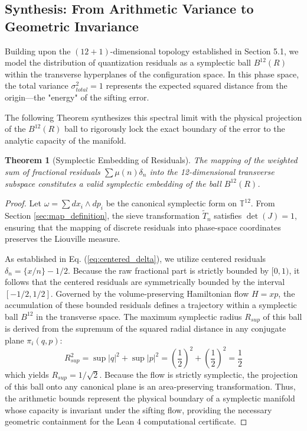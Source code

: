 \documentclass[sn-mathphys-num, pdflatex]{sn-jnl}
\newtheorem{theorem}{Theorem}[section]
\begin{document}
\subsection{Synthesis: From Arithmetic Variance to Geometric Invariance}
\label{sec:synthesis}

Building upon the $(12+1)$-dimensional topology established in Section 5.1, we model the distribution of quantization residuals as a symplectic ball $B^{12}(R)$ within the transverse hyperplanes of the configuration space. In this phase space, the total variance $\sigma_{total}^2 = 1$ represents the expected squared distance from the origin—the "energy" of the sifting error. 

The following Theorem synthesizes this spectral limit with the physical projection of the $B^{12}(R)$ ball to rigorously lock the exact boundary of the error to the analytic capacity of the manifold.

\begin{theorem}[Symplectic Embedding of Residuals]
\label{SER}
\textit{The mapping of the weighted sum of fractional residuals $\sum \mu(n) \delta_n$ into the 12-dimensional transverse subspace constitutes a valid symplectic embedding of the ball $B^{12}(R)$.}
\end{theorem}

\begin{proof}
Let $\omega = \sum dx_i \wedge dp_i$ be the canonical symplectic form on $\mathbb{T}^{12}$. From Section \ref{sec:map_definition}, the sieve transformation $\tilde{T}_n$ satisfies $\det(J) = 1$, ensuring that the mapping of discrete residuals into phase-space coordinates preserves the Liouville measure. 

As established in Eq. (\ref{eq:centered_delta}), we utilize centered residuals $\delta_n = \{x/n\} - 1/2$. Because the raw fractional part is strictly bounded by $[0, 1)$, it follows that the centered residuals are symmetrically bounded by the interval $[-1/2, 1/2]$. Governed by the volume-preserving Hamiltonian flow $H=xp$, the accumulation of these bounded residuals defines a trajectory within a symplectic ball $B^{12}$ in the transverse space. The maximum symplectic radius $R_{sup}$ of this ball is derived from the supremum of the squared radial distance in any conjugate plane $\pi_i(q, p)$:
\begin{equation}
R_{sup}^2 = \sup|q|^2 + \sup|p|^2 = \left( \frac{1}{2} \right)^2 + \left( \frac{1}{2} \right)^2 = \frac{1}{2}
\end{equation}
which yields $R_{sup} = 1/\sqrt{2}$. Because the flow is strictly symplectic, the projection of this ball onto any canonical plane is an area-preserving transformation. Thus, the arithmetic bounds represent the physical boundary of a symplectic manifold whose capacity is invariant under the sifting flow, providing the necessary geometric containment for the Lean 4 computational certificate.
\end{proof}
\end{document}
